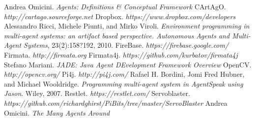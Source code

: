 \documentclass[12pt,a4paper,openright,twoside]{report}
\begin{document}
	\clearpage{\pagestyle{empty}\cleardoublepage}
	\begin{thebibliography}{90}             %
		\rhead[\fancyplain{}{\bfseries \leftmark}]{\fancyplain{}{\bfseries
				\thepage}}
		 Andrea Omicini. \textit{Agents: Definitions \& Conceptual Framework}
		 CArtAgO. \textit{http://cartago.sourceforge.net}  
		 Dropbox. \textit{https://www.dropbox.com/developers}  
		 Alessandro Ricci, Michele Piunti, and Mirko Viroli. \textit{Environment programming in multi-agent systems: an artifact based perspective. Autonomous Agents and Multi-Agent Systems}, 23(2):158?192, 2010.   
		 FireBase. \textit{https://firebase.google.com/} 
		 Firmata. \textit{http://firmata.org}
		 Firmata4j. \textit{https://github.com/kurbatov/firmata4j}
		 Stefano Mariani. \textit{JADE: Java Agent DEvelopment Framework Overview}
		 OpenCV. \textit{http://opencv.org/}
		 Pi4j. \textit{http://pi4j.com/}
		 Rafael H. Bordini, Jomi Fred Hubner, and Michael Wooldridge. \textit{Programming multi-agent system in AgentSpeak using Jason}. Wiley, 2007.
		 Restlet. \textit{https://restlet.com/}
		 Servoblaster. \textit{https://github.com/richardghirst/PiBits/tree/master/ServoBlaster}
		 Andrea Omicini. \textit{The Many Agents Around}
		
	\end{thebibliography}
\end{document}
